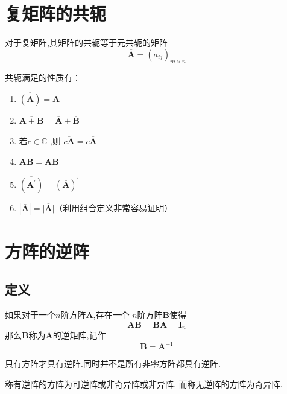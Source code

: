 \section{复矩阵的共轭}
\begin{formal}
\begin{definition}[共轭]\label{def:共轭}
    对于复矩阵,其矩阵的共轭等于元共轭的矩阵
\[
\overline{\bm{A}} =
\left(\overline{a_{ij}} \right)
_{m \times n}
\]
\end{definition}
\end{formal}
\begin{formal}
\begin{proposition}[共轭的性质]\label{prop:共轭的性质}
    共轭满足的性质有：
    \begin{enumerate}[label=\textup{(\arabic*)}]
    \item $\displaystyle \overline{\left(\overline{\bm{A}}\right)}=\bm{A}$
    \item $\overline{\bm{A} + \bm{B}} = 
    \overline{\bm{A}} + 
    \overline{\bm{B}}  $
    \item 若$c \in \mathbb{C}$
        ,则
    $\overline{c\bm{A}} = \overline{c}
    \overline{\bm{A}}$
    \item $\overline{\bm{AB}} =
    \overline{\bm{A}}
    \overline{\bm{B}}$
    \item $\overline{
        \left(\bm{A}^{\prime}\right)}
    = \left(\overline{\bm{A}} 
    \right)^{\prime}$ 
    \item $\left| \overline{\bm{A}}\right|  =
    \overline{\left|\bm{A}\right|}$（利用组合定义非常容易证明）
\end{enumerate}
\end{proposition}
\end{formal}
\newpage
\section{方阵的逆阵}
\subsection{定义}
\begin{formal}
\begin{definition}[逆阵]\label{def:逆阵}
    如果对于一个$n$阶方阵$\bm{A}$,存在一个
    $n$阶方阵$\bm{B}$使得
    \[
    \bm{AB} = \bm{BA} = \bm{I}_n
    \]
    那么$\bm{B}$称为$\bm{A}$的逆矩阵,记作
    \[
    \bm{B} = \bm{A}^{-1}
    \]
\end{definition}
\end{formal}
\begin{red}
\begin{remark}
    只有方阵才具有逆阵.同时并不是所有非零方阵都具有逆阵.
\end{remark}
\end{red}
\begin{formal}
    \begin{definition}[奇异阵]\label{def:奇异阵}
称有逆阵的方阵为可逆阵或非奇异阵或非异阵,
而称无逆阵的方阵为奇异阵.
\end{definition}
\end{formal}

